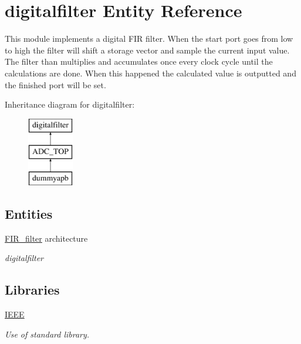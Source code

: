 \hypertarget{classdigitalfilter}{\section{digitalfilter Entity Reference}
\label{classdigitalfilter}
}


This module implements a digital F\-I\-R filter. When the start port goes from low to high the filter will shift a storage vector and sample the current input value. The filter than multiplies and accumulates once every clock cycle until the calculations are done. When this happened the calculated value is outputted and the finished port will be set.  


Inheritance diagram for digitalfilter\-:\begin{figure}[H]
\begin{center}
\leavevmode
\includegraphics[height=3.000000cm]{classdigitalfilter}
\end{center}
\end{figure}
\subsection*{Entities}
\begin{DoxyCompactItemize}
\item 
\hyperlink{classdigitalfilter_1_1FIR__filter}{F\-I\-R\-\_\-filter} architecture
\begin{DoxyCompactList}\small\item\em digitalfilter \end{DoxyCompactList}\end{DoxyCompactItemize}
\subsection*{Libraries}
 \begin{DoxyCompactItemize}
\item 
\hypertarget{classdigitalfilter_ae4f03c286607f3181e16b9aa12d0c6d4}{\hyperlink{classdigitalfilter_ae4f03c286607f3181e16b9aa12d0c6d4}{I\-E\-E\-E} }\label{classdigitalfilter_ae4f03c286607f3181e16b9aa12d0c6d4}

\begin{DoxyCompactList}\small\item\em Use of standard library. \end{DoxyCompactList}\end{DoxyCompactItemize}
